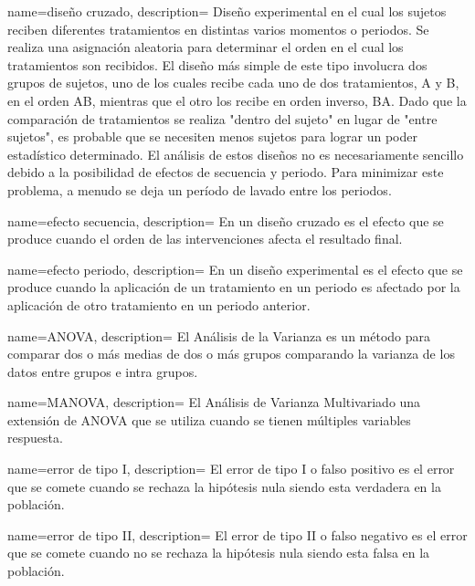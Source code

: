 {
    name=diseño cruzado,
    description={
        Diseño experimental en el cual los sujetos reciben diferentes tratamientos en distintas varios momentos o periodos.
        Se realiza una asignación aleatoria para determinar el orden en el cual los tratamientos son recibidos.
        El diseño más simple de este tipo involucra dos grupos de sujetos,
        uno de los cuales recibe cada uno de dos tratamientos, A y B, en el orden AB,
        mientras que el otro los recibe en orden inverso, BA.
        Dado que la comparación de tratamientos se realiza "dentro del sujeto" en lugar de "entre sujetos", es probable
        que se necesiten menos sujetos para lograr un poder estadístico determinado.
        El análisis de estos diseños no es necesariamente sencillo debido a la posibilidad de efectos de secuencia y periodo.
        Para minimizar este problema, a menudo se deja un período de lavado entre los periodos.
    }
}


{
    name=efecto secuencia,
    description={
        En un \gls{diseño cruzado} es el efecto que se produce cuando el orden de las intervenciones afecta el resultado final.
    }
}


{
    name=efecto periodo,
    description={
        En un diseño experimental es el efecto que se produce cuando la aplicación de un tratamiento en un periodo
        es afectado por la aplicación de otro tratamiento en un periodo anterior.
    }
}

{
    name=ANOVA,
    description={
        El Análisis de la Varianza es un método para comparar dos o más medias de dos o más grupos
        comparando la varianza de los datos entre grupos e intra grupos.
    }
}


{
    name=MANOVA,
    description={
        El Análisis de Varianza Multivariado una extensión de \gls{ANOVA}
        que se utiliza cuando se tienen múltiples variables respuesta.
    }
}



{
    name=error de tipo I,
    description={
        El error de tipo I o falso positivo es el error que se comete cuando se rechaza la hipótesis nula
        siendo esta verdadera en la población.
    }
}


{
    name=error de tipo II,
    description={
        El error de tipo II o falso negativo es el error que se comete cuando no se rechaza la hipótesis nula
        siendo esta falsa en la población.
    }
}


